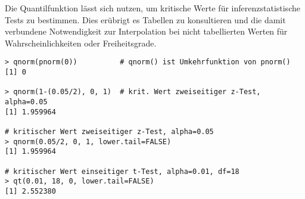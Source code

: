 Die Quantilfunktion lässt sich nutzen, um kritische Werte für inferenzstatistische Tests zu bestimmen. Dies erübrigt es Tabellen zu konsultieren und die damit verbundene Notwendigkeit zur Interpolation bei nicht tabellierten Werten für Wahrscheinlichkeiten oder Freiheitsgrade.
\begin{lstlisting}
> qnorm(pnorm(0))          # qnorm() ist Umkehrfunktion von pnorm()
[1] 0

> qnorm(1-(0.05/2), 0, 1)  # krit. Wert zweiseitiger z-Test, alpha=0.05
[1] 1.959964

# kritischer Wert zweiseitiger z-Test, alpha=0.05
> qnorm(0.05/2, 0, 1, lower.tail=FALSE)
[1] 1.959964

# kritischer Wert einseitiger t-Test, alpha=0.01, df=18
> qt(0.01, 18, 0, lower.tail=FALSE)
[1] 2.552380
\end{lstlisting}
